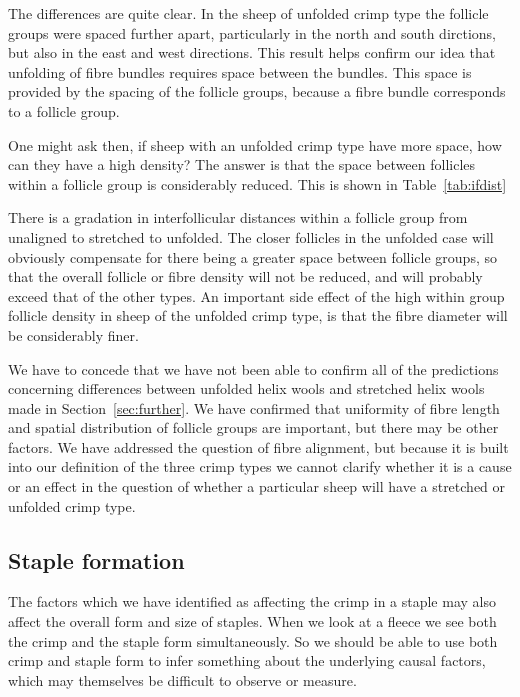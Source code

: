 \documentclass[titlepage,10pt]{article}  %
\begin{document}


The differences are quite clear. In the sheep of unfolded crimp type the follicle groups were spaced further apart, particularly in the north and south dirctions, but also in the east and west directions. This result helps confirm our idea that unfolding of fibre bundles requires space between the bundles. This space is provided by the spacing of the follicle groups, because a fibre bundle corresponds to a follicle group.

One might ask then, if sheep with an unfolded crimp type have more space, how can they have a high density? The answer is that the space between follicles within a follicle group is considerably reduced.  This is shown in Table~\ref{tab:ifdist}


 
There is a  gradation in interfollicular distances within a follicle group from unaligned to stretched to unfolded. The closer follicles in the unfolded case will obviously compensate for there being a greater space between follicle groups, so that the overall follicle or fibre density will not be reduced, and will probably exceed that of the other types. An important side effect of the high within group follicle density in sheep of the unfolded crimp type, is that the fibre diameter will be considerably finer. 

We have to concede that we have not been able to confirm all of the predictions concerning differences between unfolded helix wools and stretched helix wools made in Section~\ref{sec:further}. We have confirmed that uniformity of fibre length and spatial distribution of follicle groups are important, but there may be other factors. We have addressed the question of fibre alignment, but because it is built into our definition of the three crimp types we cannot clarify whether it is a cause or an effect in the question of whether a particular sheep will have a stretched or unfolded crimp type.

\subsection{Staple formation}
The factors which we have identified as affecting the crimp in a staple may also affect the overall form and size of staples. When we look at a fleece we see both the crimp and the staple form simultaneously. So we should be able to use both crimp and staple form to infer something about the underlying causal factors, which may themselves be difficult to observe or measure.
\end{document}
